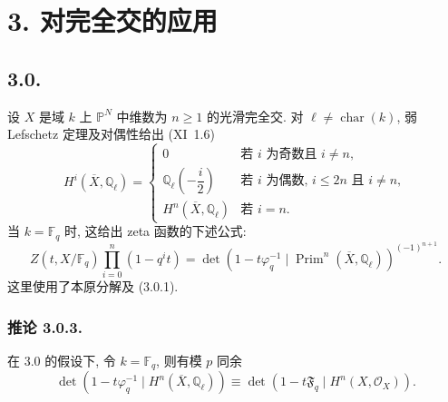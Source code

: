 \section*{3. 对完全交的应用}

\subsection*{3.0.}
设 $X$ 是域 $k$ 上 $\mathbb P^N$ 中维数为 $n\geq1$ 的光滑完全交.
对 $\ell\ne\operatorname{char}(k)$, 弱 Lefschetz 定理及对偶性给出 (XI~1.6)
\begin{equation}\tag{3.0.1}
H^i(\overline X,\mathbb Q_\ell)=
\begin{cases}
0 & \text{若 $i$ 为奇数且 $i\ne n$},\\[1.5ex]
\mathbb Q_\ell\!\left(-\dfrac{i}{2}\right)
  & \text{若 $i$ 为偶数, $i\leq2n$ 且 $i\ne n$},\\[1.5ex]
H^n(\overline X,\mathbb Q_\ell) & \text{若 $i=n$}.
\end{cases}
\end{equation}
当 $k=\mathbb F_q$ 时, 这给出 zeta 函数的下述公式:
\begin{equation}\tag{3.0.2}
Z(t,X/\mathbb F_q)\prod_{i=0}^{n}(1-q^it)
=\det\!\left(1-t\varphi_q^{-1}\mid
\operatorname{Prim}^n(\overline X,\mathbb Q_\ell)\right)^{(-1)^{n+1}}.
\end{equation}
这里使用了本原分解及 (3.0.1).

\subsubsection*{推论 3.0.3.}
在 3.0 的假设下, 令 $k=\mathbb F_q$, 则有模 $p$ 同余
\[
\det\!\left(1-t\varphi_q^{-1}\mid
H^n(\overline X,\mathbb Q_\ell)\right)
\equiv
\det\!\left(1-t\mathfrak F_q\mid H^n(X,\mathcal O_X)\right).
\]


